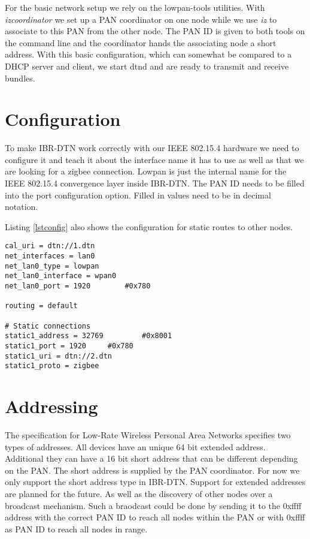 For the basic network setup we rely on the lowpan-tools utilities. With
\emph{izcoordinator} we set up a PAN coordinator on one
node while we use \emph{iz} to associate to this PAN from the other node. The PAN ID is
given to both tools on the command line and the coordinator hands the
associating node a short address. With this basic configuration, which can
somewhat be compared to a DHCP server and client, we start dtnd and are ready to
transmit and receive bundles.

\section{Configuration}

To make IBR-DTN work correctly with our IEEE 802.15.4 hardware we need to configure
it and teach it about the interface name it has to use as well as that we are
looking for a zigbee connection. Lowpan is just the internal name for the
IEEE 802.15.4 convergence layer inside IBR-DTN. The PAN ID needs to be filled into the
port configuration option. Filled in values need to be in decimal notation.

Listing \ref{lstconfig} also shows the configuration for static routes to other
nodes.

\begin{lstlisting}[caption= dtnd example configuration, label=lstconfig]
cal_uri = dtn://1.dtn
net_interfaces = lan0
net_lan0_type = lowpan
net_lan0_interface = wpan0
net_lan0_port = 1920		#0x780

routing = default

# Static connections
static1_address = 32769         #0x8001
static1_port = 1920		#0x780
static1_uri = dtn://2.dtn
static1_proto = zigbee
\end{lstlisting}

\section{Addressing}

The specification for Low-Rate Wireless Personal Area Networks specifies two
types of addresses. All devices have an unique 64 bit extended address.
Additional they can have a 16 bit short address that can be different depending
on the PAN. The short address is supplied by the PAN coordinator. For now we
only support the short address type in IBR-DTN. Support for extended addresses
are planned for the future. As well as the discovery of other nodes over a
broadcast mechanism. Such a braodcast could be done by sending it to the 0xffff
address with the correct PAN ID to reach all nodes within the PAN or with 0xffff
as PAN ID to reach all nodes in range.

